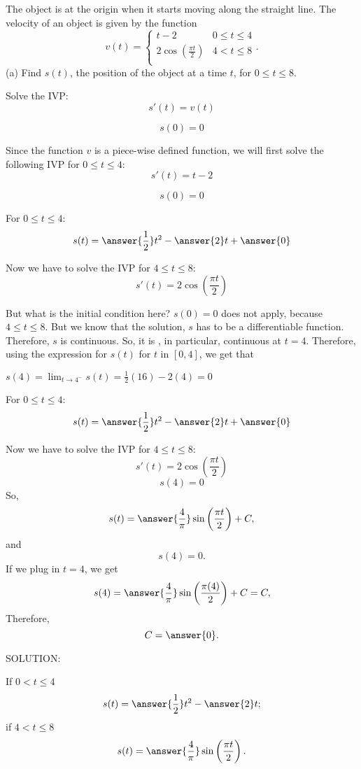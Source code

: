 \documentclass{ximera}
\author{Nela Lakos \and Kyle Parsons}
\begin{document}
\begin{exercise}

The object is at the origin when it starts moving along the straight line. The velocity of an object is given by the function
\[
v(t) = 
\begin{cases}
t-2 & 0\leq t\leq4\\
2\cos\left(\frac{\pi t}{2}\right) & 4<t\leq8\\
\end{cases}.
\]
(a) Find $s(t)$, the position of the object at a time $t$, for $0\leq t\leq8$.
\begin{hint}
Solve the IVP:
\[
s'(t) = v(t)
\]

\[
s(0) = 0
\]
\end{hint}
\begin{hint}
Since the function $v$ is a piece-wise defined function, we will first solve the following IVP for $0\leq t\leq4$:
\[
s'(t) =t-2
\]

\[
s(0) = 0
\]
\end{hint}
\begin{hint}
For $0\leq t\leq4$:
\[
s(t) =\answer{\frac{1}{2}}t^2-\answer{2}t+\answer{0}
\]
\end{hint}
\begin{hint}
Now we have to solve the IVP for $4\leq t\leq8$:
\[
s'(t) =2\cos\left(\frac{\pi t}{2}\right)
\]

But what is the initial condition here?
$s(0)=0$ does not apply, because $4\leq t\leq8$.
But we know that the solution, $s$ has to be a differentiable function.  Therefore, $s$ is continuous. So, it is , in particular, continuous at $t=4$.
Therefore, using the expression for $s(t)$ for $t$ in $[0,4]$, we get that

 $s(4)= \lim_{t\to 4^{-}}s(t)=
\frac{1}{2}(16)-2(4)=0$
\end{hint}
\begin{hint}
For $0\leq t\leq4$:
\[
s(t) =\answer{\frac{1}{2}}t^2-\answer{2}t+\answer{0}
\]
\end{hint}
\begin{hint}
Now we have to solve the IVP for $4\leq t\leq8$:
\[
s'(t) =2\cos\left(\frac{\pi t}{2}\right)
\]
\[
s(4) =0
\]
So, 
\[
s(t) =\answer{\frac{4}{\pi}}\sin\left(\frac{\pi t}{2}\right) +C,
\]
and
\[
s(4) =0.
\]
If we plug in $t=4$, we get
\[
s(4) =\answer{\frac{4}{\pi}}\sin\left(\frac{\pi (4)}{2}\right) +C=C,
\]
Therefore,
\[
C =\answer{0}.
\]
\end{hint}
SOLUTION:

If $ 0<t\leq4$
\[
s(t) = \answer{\frac{1}{2}}t^2-\answer{2}t ;  
\]
if $ 4<t\leq8$
\[
s(t)=\answer{\frac{4}{\pi}}\sin\left(\frac{\pi t}{2}\right).
\]

\end{exercise}
\end{document}

